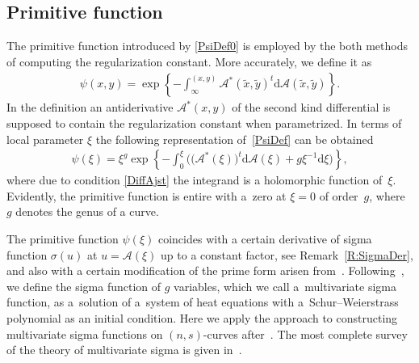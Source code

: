 \documentclass[11pt]{article}
\numberwithin{equation}{section}
\newcommand{\rmd}{\mathrm{d}}
\begin{document}
\subsection{Primitive function}
The primitive function introduced by \eqref{PsiDef0} is employed by the both methods of computing the regularization constant. More accurately, we define it as
\begin{gather}\label{PsiDef}
 \psi(x,y) = \exp\left\{-\int_{\infty}^{(x,y)} \mathcal{A}^\ast(\tilde{x},\tilde{y})^{t} \rmd \mathcal{A}(\tilde{x},\tilde{y}) \right\}.
\end{gather}
In the definition an antiderivative $\mathcal{A}^\ast(x,y)$ of the second kind differential is supposed to contain the regularization constant when parametrized. In terms of local parameter $\xi$ the following representation of~\eqref{PsiDef} can be obtained
\begin{gather*}%
\psi(\xi) = \xi^g \exp \left\{-\int_0^{\xi} \big(\big(\mathcal{A}^\ast(\xi)\big)^t \rmd \mathcal{A}(\xi) + g \xi^{-1}\rmd\xi \big)\right\},
\end{gather*}
where due to condition \eqref{DiffAjst} the integrand is a holomorphic function of~$\xi$. Evidently, the primitive function is entire with a~zero at $\xi=0$ of order~$g$, where~$g$ denotes the genus of a curve.

The primitive function $\psi(\xi)$ coincides with a certain derivative of sigma function $\sigma(u)$ at $u= \mathcal{A}(\xi)$ up to a constant factor, see Remark~\ref{R:SigmaDer}, and also with a certain modification of the prime form arisen from~\cite{N2010}. Following~\cite{BL2004}, we define the sigma function of $g$ variables, which we call a~multivariate sigma function, as a~solution of a~system of heat equations with a~Schur--Weierstrass polynomial as an initial condition. Here we apply the approach to constructing multivariate sigma functions on $(n,s)$-curves after~\cite{BL2004,BL2008}. The most complete survey of the theory of multivariate sigma is given in~\cite{BEL2012}.
\end{document}
